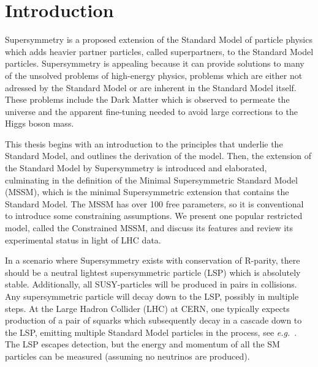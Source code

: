 \documentclass[twoside,english]{uiofysmaster}
\begin{document}
\tableofcontents
\listoffigures
\listoftables


\chapter*{Introduction}
Supersymmetry is a proposed extension of the Standard Model of particle physics which adds heavier partner particles, called superpartners, to the Standard Model particles. Supersymmetry is appealing because it can provide solutions to many of the unsolved problems of high-energy physics, problems which are either not adressed by the Standard Model or are inherent in the Standard Model itself. These problems include the Dark Matter which is observed to permeate the universe and the apparent fine-tuning needed to avoid large corrections to the Higgs boson mass.

This thesis begins with an introduction to the principles that underlie the Standard Model, and outlines the derivation of the model. Then, the extension of the Standard Model by Supersymmetry is introduced and elaborated, culminating in the definition of the Minimal Supersymmetric Standard Model (MSSM), which is the minimal Supersymmetric extension that contains the Standard Model. The MSSM has over 100 free parameters, so it is conventional to introduce some constraining assumptions. We present one popular restricted model, called the Constrained MSSM, and discuss its features and review its experimental status in light of LHC data.

In a scenario where Supersymmetry exists with conservation of R-parity, there should be a neutral lightest supersymmetric particle (LSP) which is absolutely stable. Additionally, all SUSY-particles will be produced in pairs in collisions. Any supersymmetric particle will decay down to the LSP, possibly in multiple steps. At the Large Hadron Collider (LHC) at CERN, one typically expects production of a pair of squarks which subsequently decay in a cascade down to the LSP, emitting multiple Standard Model particles in the process, see {\it e.g.}~\cite{Martin:1997ns}. The LSP escapes detection, but the energy and momentum of all the SM particles can be measured (assuming no neutrinos are produced).
\end{document}
